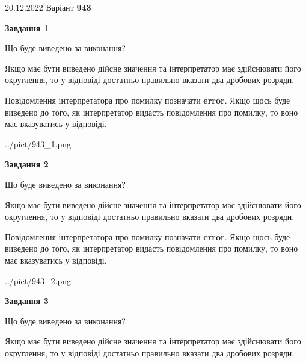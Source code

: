 \documentclass[12pt, ukrainian]{article}
\begin{document}
{20.12.2022 Варіант \No \textbf { 943 }\par}
{
\begin {Large}

{\begin {center}\textbf{Завдання 1}\end {center}}\par
Що буде виведено за виконання? \par

Якщо має бути виведено дійсне значення та інтерпретатор має здійснювати його округлення, 
то у відповіді достатньо правильно вказати два дробових розряди.

Повідомлення інтерпретатора про помилку позначати \textbf{error}.
Якщо щось буде виведено до того, як інтерпретатор видасть повідомлення про помилку, 
то воно має вказуватись у відповіді. \par

\begin{center}
	{../pict/943_1.png}
\end{center}
\newpage

{\begin {center}\textbf{Завдання 2}\end {center}}\par
Що буде виведено за виконання? \par

Якщо має бути виведено дійсне значення та інтерпретатор має здійснювати його округлення, 
то у відповіді достатньо правильно вказати два дробових розряди.

Повідомлення інтерпретатора про помилку позначати \textbf{error}.
Якщо щось буде виведено до того, як інтерпретатор видасть повідомлення про помилку, 
то воно має вказуватись у відповіді. \par

\begin{center}
	{../pict/943_2.png}
\end{center}
\newpage

{\begin {center}\textbf{Завдання 3}\end {center}}\par
Що буде виведено за виконання? \par

Якщо має бути виведено дійсне значення та інтерпретатор має здійснювати його округлення, 
то у відповіді достатньо правильно вказати два дробових розряди.


\end{Large}}
\end{document}
